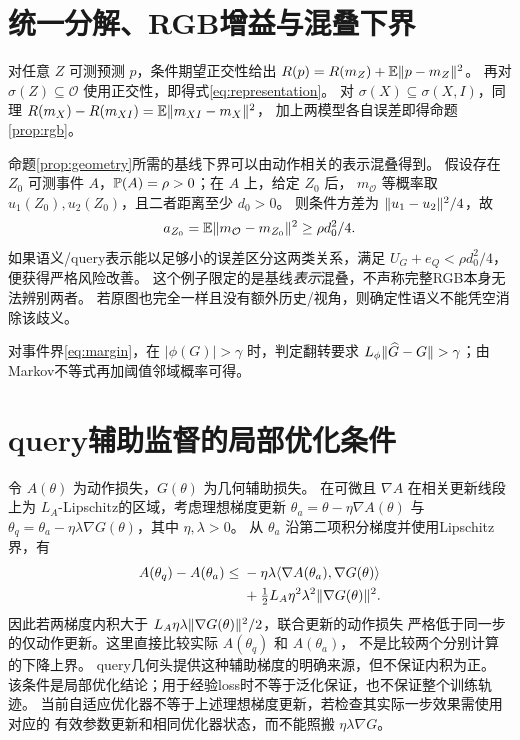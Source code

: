 \section{统一分解、RGB增益与混叠下界}
对任意 $Z$ 可测预测 $p$，条件期望正交性给出
$R(p)=R(m_Z)+\mathbb E\lVert p-m_Z\rVert^2$。
再对 $\sigma(Z)\subseteq\mathcal O$ 使用正交性，即得式\eqref{eq:representation}。
对 $\sigma(X)\subseteq\sigma(X,I)$，同理
$R(m_X)-R(m_{XI})=\mathbb E\lVert m_{XI}-m_X\rVert^2$，
加上两模型各自误差即得命题\ref{prop:rgb}。

命题\ref{prop:geometry}所需的基线下界可以由动作相关的表示混叠得到。
假设存在 $Z_0$ 可测事件 $A$，$\mathbb P(A)=\rho>0$；在 $A$ 上，给定 $Z_0$ 后，
$m_{\mathcal O}$ 等概率取 $u_1(Z_0),u_2(Z_0)$，且二者距离至少 $d_0>0$。
则条件方差为 $\lVert u_1-u_2\rVert^2/4$，故
\begin{equation}
 a_{Z_0}=\mathbb E\lVert m_{\mathcal O}-m_{Z_0}\rVert^2\geq\rho d_0^2/4.
 \label{eq:aliaslower}
\end{equation}
如果语义/query表示能以足够小的误差区分这两类关系，满足
$U_G+e_Q<\rho d_0^2/4$，便获得严格风险改善。
这个例子限定的是基线\emph{表示}混叠，不声称完整RGB本身无法辨别两者。
若原图也完全一样且没有额外历史/视角，则确定性语义不能凭空消除该歧义。

对事件界\eqref{eq:margin}，在 $|\phi(G)|>\gamma$ 时，判定翻转要求
$L_\phi\lVert\widehat G-G\rVert>\gamma$；由Markov不等式再加阈值邻域概率可得。

\section{query辅助监督的局部优化条件}
令 $A(\theta)$ 为动作损失，$G(\theta)$ 为几何辅助损失。
在可微且 $\nabla A$ 在相关更新线段上为 $L_A$-Lipschitz的区域，考虑理想梯度更新
$\theta_a=\theta-\eta\nabla A(\theta)$ 与
$\theta_q=\theta_a-\eta\lambda\nabla G(\theta)$，其中 $\eta,\lambda>0$。
从 $\theta_a$ 沿第二项积分梯度并使用Lipschitz界，有
\begin{align}
 A(\theta_q)-A(\theta_a)
 \leq{}&-\eta\lambda\langle\nabla A(\theta_a),\nabla G(\theta)\rangle\nonumber\\
 &+\tfrac12 L_A\eta^2\lambda^2\lVert\nabla G(\theta)\rVert^2.
 \label{eq:auxdescent}
\end{align}
因此若两梯度内积大于
$L_A\eta\lambda\lVert\nabla G(\theta)\rVert^2/2$，联合更新的动作损失
严格低于同一步的仅动作更新。这里直接比较实际 $A(\theta_q)$ 和 $A(\theta_a)$，
不是比较两个分别计算的下降上界。
query几何头提供这种辅助梯度的明确来源，但不保证内积为正。
该条件是局部优化结论；用于经验loss时不等于泛化保证，也不保证整个训练轨迹。
当前自适应优化器不等于上述理想梯度更新，若检查其实际一步效果需使用对应的
有效参数更新和相同优化器状态，而不能照搬 $\eta\lambda\nabla G$。

